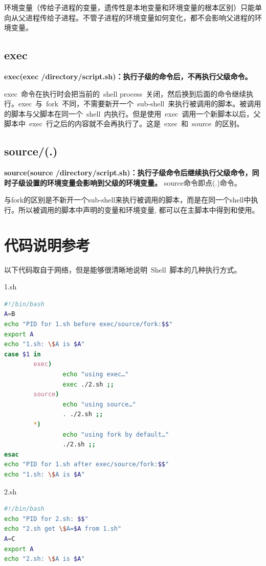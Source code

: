 \documentclass[a4paper]{ctexart}
\begin{document}
环境变量（传给子进程的变量，遗传性是本地变量和环境变量的根本区别）只能单向从父进程传给子进程。不管子进程的环境变量如何变化，都不会影响父进程的环境变量。

\subsection{exec}
\textbf
{exec(exec /directory/script.sh)：执行子级的命令后，不再执行父级命令。}

exec~命令在执行时会把当前的~shell process~关闭，然后换到后面的命令继续执行。exec~与~fork~不同，不需要新开一个~sub-shell~来执行被调用的脚本。被调用的脚本与父脚本在同一个~shell~内执行。但是使用~exec~调用一个新脚本以后，父脚本中~exec~行之后的内容就不会再执行了。这是~exec~和~source~的区别。

\subsection{source/(.)}
\textbf
{source(source /directory/script.sh)：执行子级命令后继续执行父级命令，同时子级设置的环境变量会影响到父级的环境变量。}
source命令即点(.)命令。

与fork的区别是不新开一个sub-shell来执行被调用的脚本，而是在同一个shell中执行。所以被调用的脚本中声明的变量和环境变量, 都可以在主脚本中得到和使用。

\section{代码说明参考}
以下代码取自于网络，但是能够很清晰地说明~Shell~脚本的几种执行方式。

1.sh
\begin{lstlisting}[language=bash,showstringspaces=false]
#!/bin/bash
A=B 
echo "PID for 1.sh before exec/source/fork:$$"
export A
echo "1.sh: \$A is $A"
case $1 in
        exec)
                echo "using exec…"
                exec ./2.sh ;;
        source)
                echo "using source…"
                . ./2.sh ;;
        *)
                echo "using fork by default…"
                ./2.sh ;;
esac
echo "PID for 1.sh after exec/source/fork:$$"
echo "1.sh: \$A is $A"
\end{lstlisting}

2.sh
\begin{lstlisting}[language=bash,showstringspaces=false]
#!/bin/bash
echo "PID for 2.sh: $$"
echo "2.sh get \$A=$A from 1.sh"
A=C
export A
echo "2.sh: \$A is $A"
\end{lstlisting}
\end{document}

